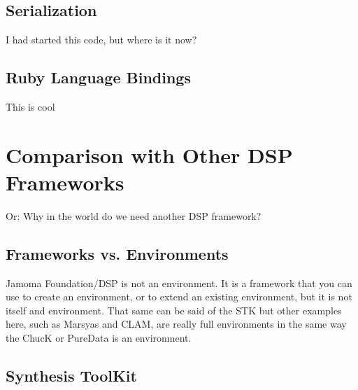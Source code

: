 \documentclass[twoside,10pt]{article}
\begin{document}
\subsection{Serialization}

I had started this code, but where is it now?


\subsection{Ruby Language Bindings}

This is cool




\section{Comparison with Other DSP Frameworks} %

Or: Why in the world do we need another DSP framework?

%

\subsection {Frameworks vs. Environments}


Jamoma Foundation/DSP is not an environment.  It is a framework that you can use to create an environment, or to extend an existing environment, but it is not itself and environment.  That same can be said of the STK but other examples here, such as Marsyas and CLAM, are really full environments in the same way the ChucK or PureData is an environment.


\subsection{Synthesis ToolKit} %
\end{document}
